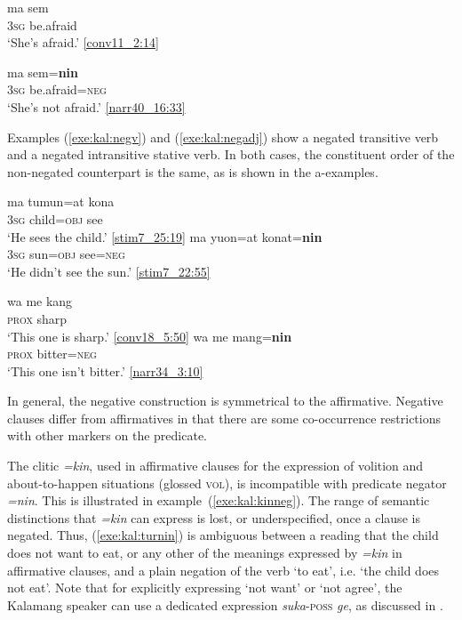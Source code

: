 \documentclass[output=paper,colorlinks,citecolor=brown,draft]{langscibook}
\begin{document}
\ea \label{exe:kal:sem}
\ea \label{exe:kal:masem}{
	\gll ma sem\\
	\textsc{3sg} be.afraid\\
	\glt `She's afraid.' {\href{http://hdl.handle.net/10050/00-0000-0000-0004-1BA2-F}{[conv11\_2:14]}}}

\ex \label{exe:kal:SV}{
	\gll ma sem=\textbf{nin}\\
	\textsc{3sg} be.afraid=\textsc{neg}\\
	\glt	`She's not afraid.' {\href{http://hdl.handle.net/10050/00-0000-0000-0004-1BBB-2}{[narr40\_16:33]}}}
\z 
\z  

Examples (\ref{exe:kal:negv}) and (\ref{exe:kal:negadj}) show a negated transitive verb and a negated intransitive stative verb. In both cases, the constituent order of the non-negated counterpart is the same, as is shown in the a-examples. 

\ea 	\label{exe:kal:negv}	
\ea \gll ma tumun=at kona\\
\textsc{3sg} child=\textsc{obj} see\\
\glt `He sees the child.' {\href{http://hdl.handle.net/10050/00-0000-0000-0004-1BAA-C}{[stim7\_25:19]}}
\ex \gll ma yuon=at konat=\textbf{nin}\\
\textsc{3sg} sun=\textsc{obj} see=\textsc{neg}\\
\glt 	`He didn't see the sun.' {\href{http://hdl.handle.net/10050/00-0000-0000-0004-1BAA-C}{[stim7\_22:55]}}
\z
\z 

\ea \label{exe:kal:negadj}	
\ea \gll wa me kang\\
\textsc{prox} {\glme} sharp\\
\glt `This one is sharp.' {\href{http://hdl.handle.net/10050/00-0000-0000-0004-1BB6-D}{[conv18\_5:50]}}
\ex \gll wa me mang=\textbf{nin}\\
\textsc{prox} {\glme} bitter=\textsc{neg}\\
\glt	`This one isn't bitter.' {\href{http://hdl.handle.net/10050/00-0000-0000-0004-1BB1-3}{[narr34\_3:10]}}
\z \z 

In general, the negative construction is symmetrical to the affirmative. Negative clauses differ from affirmatives in that there are some co-occurrence restrictions with other markers on the predicate.

The clitic \textit{=kin}, used in affirmative clauses for the expression of volition and about-to-happen situations (glossed \textsc{vol}), is incompatible with predicate negator \textit{=nin}. This is illustrated in example~(\ref{exe:kal:kinneg}). The range of semantic distinctions that \textit{=kin} can express is lost, or underspecified, once a clause is negated. Thus, (\ref{exe:kal:turnin}) is ambiguous between a reading that the child does not want to eat, or any other of the meanings expressed by \textit{=kin} in affirmative clauses, and a plain negation of the verb `to eat', i.e. `the child does not eat'. Note that for explicitly expressing `not want' or `not agree', the Kalamang speaker can use a dedicated expression \textit{suka}-\textsc{poss} \textit{ge}, as discussed in .
\end{document}
